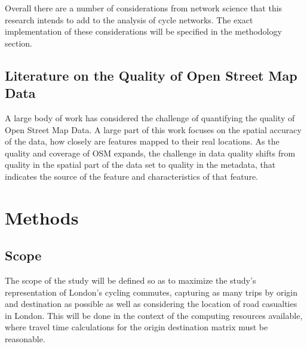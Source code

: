 \documentclass[11pt]{article} %
\begin{document}
Overall there are a number of considerations from network science that this research intends to add to the analysis of cycle networks. The exact implementation of these considerations will be specified in the methodology section. 



\subsection{Literature on the Quality of Open Street Map Data}

A large body of work has considered the challenge of quantifying the quality of Open Street Map Data. A large part of this work focuses on the spatial accuracy of the data, how closely are features mapped to their real locations. As the quality and coverage of OSM expands, the challenge in data quality shifts from quality in the spatial part of the data set to quality in the metadata, that indicates the source of the feature and characteristics of that feature. 



\section{Methods}


\subsection{Scope}

The scope of the study will be defined so as to maximize the study's representation of London's cycling commutes, capturing as many trips by origin and destination as possible as well as considering the location of road casualties in London. This will be done in the context of the computing resources available, where travel time calculations for the origin destination matrix must be reasonable. 

\end{document}
